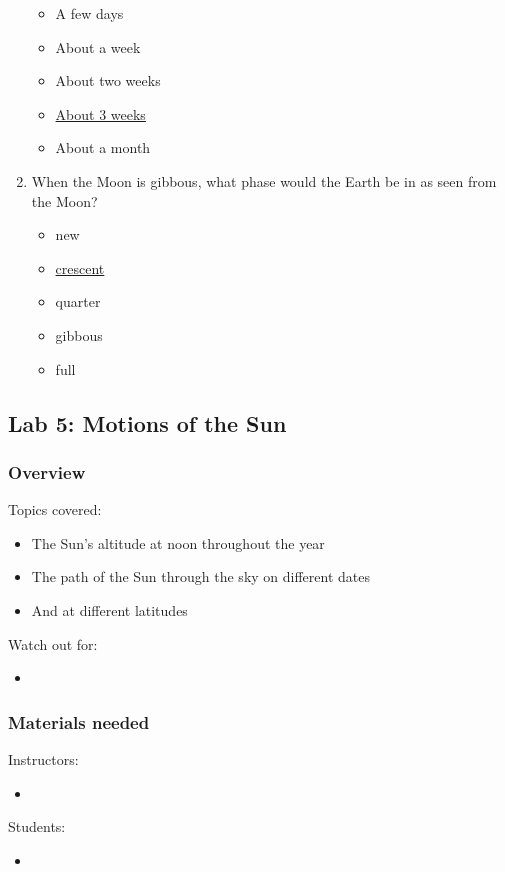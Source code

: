 \documentclass[12pt]{article}
\begin{document}
\begin{enumerate}
\begin{itemize}
    \item A few days
    \item About a week
    \item About two weeks
    \item \underline{About 3 weeks}
    \item About a month
\end{itemize}
\item
When the Moon is gibbous, what phase would the Earth be in as seen from the Moon?
\begin{itemize}
    \item new
    \item \underline{crescent}
    \item quarter
    \item gibbous
    \item full
\end{itemize}
\end{enumerate}

\newpage
\subsection{Lab 5: Motions of the Sun}
\subsubsection{Overview}
Topics covered:
\begin{itemize}
\item The Sun’s altitude at noon throughout the year
\item The path of the Sun through the sky on different dates \item And at different latitudes
\end{itemize}
Watch out for:
\begin{itemize}
\item 
\end{itemize}

\subsubsection{Materials needed}
Instructors:
\begin{itemize}
  \item 
\end{itemize}
Students:
\begin{itemize}
  \item 
\end{itemize}
\end{document}
